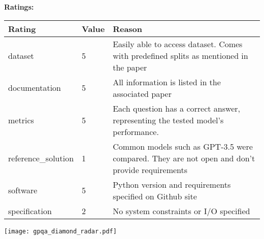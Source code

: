 {{{\bf Ratings:} ~ \\

\begin{tabular}{p{} p{} p{}}
\hline
Rating & Value & Reason \\
\hline
dataset & 5 & Easily able to access dataset. Comes with predefined splits as mentioned in the paper
 \\
documentation & 5 & All information is listed in the associated paper
 \\
metrics & 5 & Each question has a correct answer, representing the tested model's performance.
 \\
reference\_solution & 1 & Common models such as GPT-3.5 were compared. They are not open and don't provide requirements
 \\
software & 5 & Python version and requirements specified on Github site
 \\
specification & 2 & No system constraints or I/O specified
 \\
\hline
\end{tabular}

\texttt{[image: gpqa\_diamond\_radar.pdf]}
}}
\clearpage